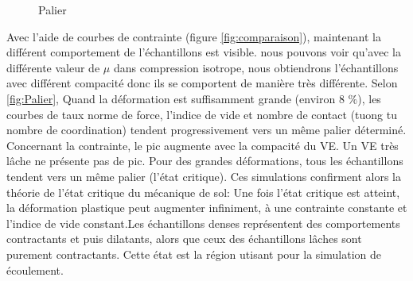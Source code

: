 \documentclass[a4paper,12pt]{report}
\begin{document}
\begin{figure}[h!]
    \centering
  \caption{Palier}
    \label{fig:Palier}
\end{figure}
Avec l'aide de courbes de contrainte (figure \ref{fig:comparaison}), maintenant la différent comportement de l'échantillons est visible.
nous pouvons voir qu’avec la différente valeur de $\mu$ dans compression isotrope, nous obtiendrons l’échantillons avec différent compacité donc ils se comportent de manière très différente.
Selon \autoref{fig:Palier}, Quand la déformation est suffisamment grande (environ 8 $\%$), les courbes de taux norme de force, l'indice de vide et nombre de contact (tuong tu nombre de coordination) tendent progressivement vers un même palier déterminé.
Concernant la contrainte, le pic augmente avec la compacité du VE. Un VE très lâche ne présente pas de pic. Pour des grandes déformations, tous les échantillons tendent vers un même palier (l’état critique).
Ces simulations confirment alors la théorie de l’état critique du mécanique de sol: Une fois l’état critique est atteint, la déformation plastique peut augmenter infiniment, à une contrainte constante et l'indice de vide constant.Les échantillons denses représentent des comportements contractants et puis dilatants, alors que ceux des échantillons lâches sont purement contractants.
Cette état est la région utisant pour la simulation de écoulement.
\end{document}
